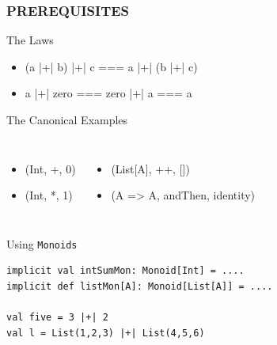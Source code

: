 \documentclass{beamer}
\begin{document}
\begin{frame}[fragile] \frametitle{PREREQUISITES}
  \begin{block}{The Laws}
      \begin{itemize}
        \tt
        \item (a |+| b) |+| c === a |+| (b |+| c)
        \item a |+| zero === zero |+| a === a
      \end{itemize}
  \end{block}

  \begin{block}{The Canonical Examples}

  \begin{columns}
      \begin{itemize}
        \tt
      \item (Int, +, 0)
      \item (Int, *, 1)
      \end{itemize}
      \begin{itemize}
        \tt
      \item (List[A], ++, [])
      \item (A => A, andThen, identity)
      \end{itemize}
  \end{columns}
  \end{block}

  \begin{block}{Using \texttt{Monoids}}
  \begin{lstlisting}
implicit val intSumMon: Monoid[Int] = ....
implicit def listMon[A]: Monoid[List[A]] = ....

val five = 3 |+| 2
val l = List(1,2,3) |+| List(4,5,6)
  \end{lstlisting}
  \vspace{-.5cm}
  \end{block}
\end{frame}
\end{document}
